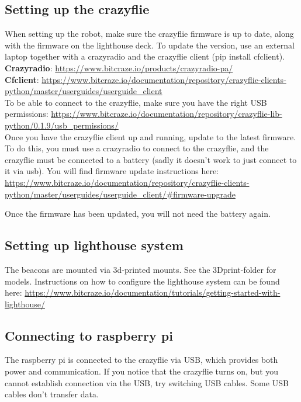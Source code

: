 \documentclass[10pt,a4paper]{article}
\begin{document}
	\subsection{Setting up the crazyflie}
		When setting up the robot, make sure the crazyflie firmware is up to date, along with the firmware on the lighthouse deck. To update the version, use an external laptop together with a crazyradio and the crazyflie client (pip install cfclient).
		\\
		
		\textbf{Crazyradio}: \url{https://www.bitcraze.io/products/crazyradio-pa/}\\
		\textbf{Cfclient}: \url{https://www.bitcraze.io/documentation/repository/crazyflie-clients-python/master/userguides/userguide_client}
		\\
		
		To be able to connect to the crazyflie, make sure you have the right USB permissions: \url{https://www.bitcraze.io/documentation/repository/crazyflie-lib-python/0.1.9/usb_permissions/}
		\\
		
		Once you have the crazyflie client up and running, update to the latest firmware. To do this, you must use a crazyradio to connect to the crazyflie, and the crazyflie must be connected to a battery (sadly it doesn't work to just connect to it via usb). You will find firmware update instructions here:
		\url{https://www.bitcraze.io/documentation/repository/crazyflie-clients-python/master/userguides/userguide_client/#firmware-upgrade}
		
		Once the firmware has been updated, you will not need the battery again.
		
	\subsection{Setting up lighthouse system}
		The beacons are mounted via 3d-printed mounts. See the 3Dprint-folder for models. Instructions on how to configure the lighthouse system can be found here:
		\url{https://www.bitcraze.io/documentation/tutorials/getting-started-with-lighthouse/}
		
		
	\subsection{Connecting to raspberry pi}
		The raspberry pi is connected to the crazyflie via USB, which provides both power and communication. If you notice that the crazyflie turns on, but you cannot establish connection via the USB, try switching USB cables. Some USB cables don't transfer data.
	
\end{document}
